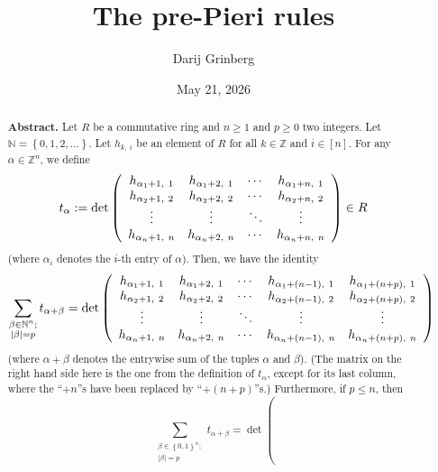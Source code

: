 \documentclass
[numbers=enddot,12pt,final,onecolumn,notitlepage,english]{scrartcl}%
\theoremstyle{definition}
\let\sumnonlimits\sum
\renewcommand{\sum}{\sumnonlimits\limits}
\begin{document}
\title{The pre-Pieri rules}
\author{Darij Grinberg}
\date{May 21, 2026}
\maketitle

\begin{abstract}
\textbf{Abstract.} Let $R$ be a commutative ring and $n\geq1$ and $p\geq0$ two
integers. Let $\mathbb{N}=\left\{  0,1,2,\ldots\right\}  $. Let $h_{k,\ i}$ be
an element of $R$ for all $k\in\mathbb{Z}$ and $i\in\left[  n\right]  $. For
any $\alpha\in\mathbb{Z}^{n}$, we define%
\[
t_{\alpha}:=\det\left(
\begin{array}
[c]{cccc}%
h_{\alpha_{1}+1,\ 1} & h_{\alpha_{1}+2,\ 1} & \cdots & h_{\alpha_{1}+n,\ 1}\\
h_{\alpha_{2}+1,\ 2} & h_{\alpha_{2}+2,\ 2} & \cdots & h_{\alpha_{2}+n,\ 2}\\
\vdots & \vdots & \ddots & \vdots\\
h_{\alpha_{n}+1,\ n} & h_{\alpha_{n}+2,\ n} & \cdots & h_{\alpha_{n}+n,\ n}%
\end{array}
\right)  \in R
\]
(where $\alpha_{i}$ denotes the $i$-th entry of $\alpha$). Then, we have the
identity%
\[
\sum_{\substack{\beta\in\mathbb{N}^{n};\\\left\vert \beta\right\vert
=p}}t_{\alpha+\beta}=\det\left(
\begin{array}
[c]{ccccc}%
h_{\alpha_{1}+1,\ 1} & h_{\alpha_{1}+2,\ 1} & \cdots & h_{\alpha_{1}+\left(
n-1\right)  ,\ 1} & h_{\alpha_{1}+\left(  n+p\right)  ,\ 1}\\
h_{\alpha_{2}+1,\ 2} & h_{\alpha_{2}+2,\ 2} & \cdots & h_{\alpha_{2}+\left(
n-1\right)  ,\ 2} & h_{\alpha_{2}+\left(  n+p\right)  ,\ 2}\\
\vdots & \vdots & \ddots & \vdots & \vdots\\
h_{\alpha_{n}+1,\ n} & h_{\alpha_{n}+2,\ n} & \cdots & h_{\alpha_{n}+\left(
n-1\right)  ,\ n} & h_{\alpha_{n}+\left(  n+p\right)  ,\ n}%
\end{array}
\right)
\]
(where $\alpha+\beta$ denotes the entrywise sum of the tuples $\alpha$ and
$\beta$). (The matrix on the right hand side here is the one from the
definition of $t_{\alpha}$, except for its last column, where the
\textquotedblleft$+n$\textquotedblright s have been replaced by
\textquotedblleft$+\left(  n+p\right)  $\textquotedblright s.) Furthermore, if
$p\leq n$, then
\[
\sum_{\substack{\beta\in\left\{  0,1\right\}  ^{n};\\\left\vert \beta
\right\vert =p}}t_{\alpha+\beta}=\det\left(
\]
\end{abstract}
\end{document}
